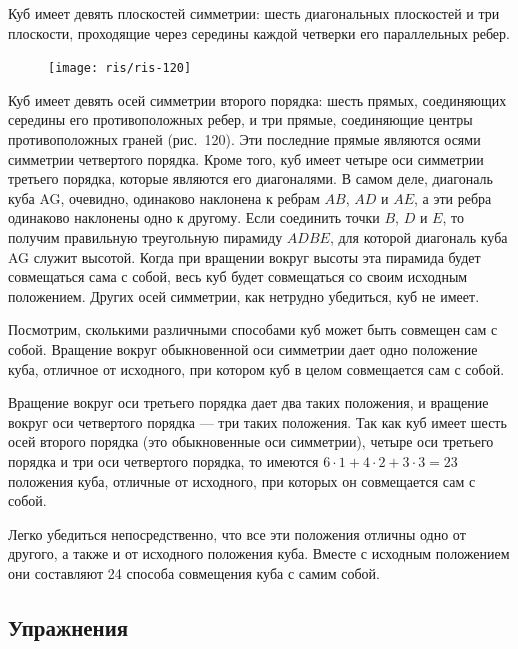 \documentclass[twoside]{book}
\begin{document}
Куб имеет девять плоскостей симметрии: шесть диагональных плоскостей и три плоскости, проходящие через середины каждой четверки его параллельных ребер.

\begin{figure}[h!]
\centering
\texttt{[image: ris/ris-120]}
\caption{}
\end{figure}

Куб имеет девять осей симметрии второго порядка: шесть прямых, соединяющих середины его противоположных ребер, и три прямые, соединяющие центры противоположных граней (рис.~120).
Эти последние прямые являются осями симметрии четвертого порядка. %
Кроме того, куб имеет четыре оси симметрии третьего порядка, которые являются его диагоналями.
В самом деле, диагональ куба AG, очевидно, одинаково наклонена к ребрам $AB$, $AD$ и $AE$, а эти ребра одинаково наклонены одно к другому.
Если соединить точки $B$, $D$ и $E$, то получим правильную треугольную пирамиду $ADBE$, для которой диагональ куба AG служит высотой.
Когда при вращении вокруг высоты эта пирамида будет совмещаться сама с собой, весь куб будет совмещаться со своим исходным положением.
Других осей симметрии, как нетрудно убедиться, куб не имеет.

Посмотрим, сколькими различными способами куб может быть совмещен сам с собой.
Вращение вокруг обыкновенной оси симметрии дает одно положение куба, отличное от исходного, при котором куб в целом совмещается сам с собой.

Вращение вокруг оси третьего порядка дает два таких положения, и вращение вокруг оси четвертого порядка --- три таких положения.
Так как куб имеет шесть осей второго порядка (это обыкновенные оси симметрии), четыре оси третьего порядка и три оси четвертого порядка, то имеются $6\cdot 1 + 4\cdot 2 + 3\cdot 3 = 23$ положения куба, отличные от исходного, при которых он совмещается сам с собой.

Легко убедиться непосредственно, что все эти положения отличны одно от другого, а также и от исходного положения куба.
Вместе с исходным положением они составляют 24 способа совмещения куба с самим собой. %

\subsection*{Упражнения}
\end{document}
